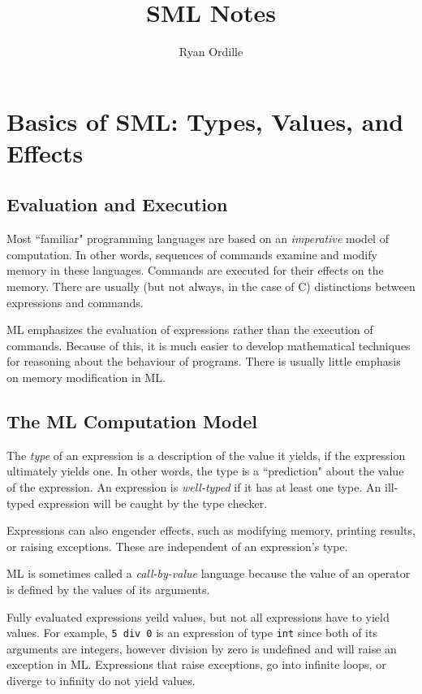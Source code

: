 \documentclass[11pt]{article}
\title{SML Notes}
\author{Ryan Ordille}
\date{}                                           %
\begin{document}
\maketitle

\section{Basics of SML: Types, Values, and Effects}
\subsection{Evaluation and Execution}

Most ``familiar" programming languages are based on an \emph{imperative} model of computation. In other words, sequences of commands examine and modify memory in these languages. Commands are executed for their effects on the memory. There are usually (but not always, in the case of C) distinctions between expressions and commands.

ML emphasizes the evaluation of expressions rather than the execution of commands. Because of this, it is much easier to develop mathematical techniques for reasoning about the behaviour of programs. There is usually little emphasis on memory modification in ML.

\subsection{The ML Computation Model}

The \emph{type} of an expression is a description of the value it yields, if the expression ultimately yields one. In other words, the type is a ``prediction" about the value of the expression. An expression is \emph{well-typed} if it has at least one type. An ill-typed expression will be caught by the type checker.

Expressions can also engender effects, such as modifying memory, printing results, or raising exceptions. These are independent of an expression's type.

ML is sometimes called a \emph{call-by-value} language because the value of an operator is defined by the values of its arguments.

Fully evaluated expressions yeild values, but not all expressions have to yield values. For example, \verb!5 div 0! is an expression of type \verb!int! since both of its arguments are integers, however division by zero is undefined and will raise an exception in ML. Expressions that raise exceptions, go into infinite loops, or diverge to infinity do not yield values.
\end{document}
